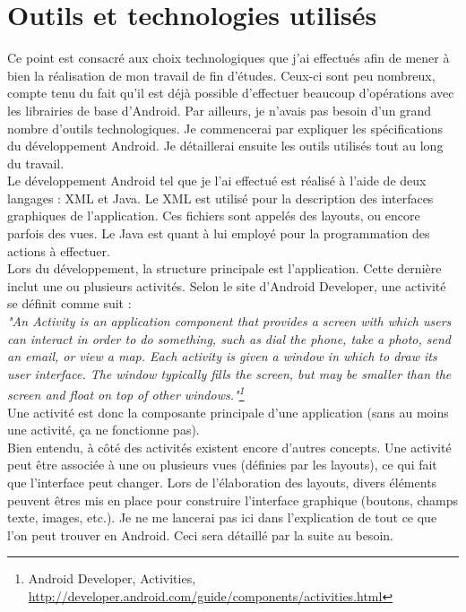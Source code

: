 \section{Outils et technologies utilisés}
Ce point est consacré aux choix technologiques que j'ai effectués afin de mener à bien la réalisation de mon travail de fin d'études. Ceux-ci sont peu nombreux, compte tenu du fait qu'il est déjà possible d'effectuer beaucoup d'opérations avec les librairies de base d'Android. Par ailleurs, je n'avais pas besoin d'un grand nombre d'outils technologiques. Je commencerai par expliquer les spécifications du développement Android. Je détaillerai ensuite les outils utilisés tout au long du travail.\\

Le développement Android tel que je l'ai effectué est réalisé à l'aide de deux langages : XML et Java. Le XML est utilisé pour la description des interfaces graphiques de l'application. Ces fichiers sont appelés des layouts, ou encore parfois des vues. Le Java est quant à lui employé pour la programmation des actions à effectuer.\\

Lors du développement, la structure principale est l'application. Cette dernière inclut une ou plusieurs activités. Selon le site d'Android Developer, une activité se définit comme suit :\\
\textit{"An Activity is an application component that provides a screen with which users can interact in order to do something, such as dial the phone, take a photo, send an email, or view a map. Each activity is given a window in which to draw its user interface. The window typically fills the screen, but may be smaller than the screen and float on top of other windows."\footnote{Android Developer, Activities, \url{http://developer.android.com/guide/components/activities.html}}}\\
Une activité est donc la composante principale d'une application (sans au moins une activité, ça ne fonctionne pas).\\

Bien entendu, à côté des activités existent encore d'autres concepts. Une activité peut être associée à une ou plusieurs vues (définies par les layouts), ce qui fait que l'interface peut changer. Lors de l'élaboration des layouts, divers éléments peuvent êtres mis en place pour construire l'interface graphique (boutons, champs texte, images, etc.). Je ne me lancerai pas ici dans l'explication de tout ce que l'on peut trouver en Android. Ceci sera détaillé par la suite au besoin.\\

